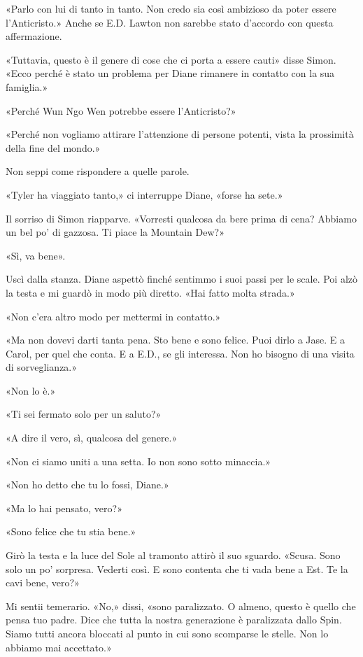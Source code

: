 «Parlo con lui di tanto in tanto. Non credo sia così ambizioso da poter
essere l'Anticristo.» Anche se E.D. Lawton non sarebbe stato d'accordo
con questa affermazione.

«Tuttavia, questo è il genere di cose che ci porta a essere cauti» disse
Simon. «Ecco perché è stato un problema per Diane rimanere in contatto
con la sua famiglia.»

«Perché Wun Ngo Wen potrebbe essere l'Anticristo?»

«Perché non vogliamo attirare l'attenzione di persone potenti, vista la
prossimità della fine del mondo.»

Non seppi come rispondere a quelle parole.

«Tyler ha viaggiato tanto,» ci interruppe Diane, «forse ha sete.»

Il sorriso di Simon riapparve. «Vorresti qualcosa da bere prima di cena?
Abbiamo un bel po' di gazzosa. Ti piace la Mountain Dew?»

«Sì, va bene».

Uscì dalla stanza. Diane aspettò finché sentimmo i suoi passi per le
scale. Poi alzò la testa e mi guardò in modo più diretto. «Hai fatto
molta strada.»

«Non c'era altro modo per mettermi in contatto.»

«Ma non dovevi darti tanta pena. Sto bene e sono felice. Puoi dirlo a
Jase. E a Carol, per quel che conta. E a E.D., se gli interessa. Non ho
bisogno di una visita di sorveglianza.»

«Non lo è.»

«Ti sei fermato solo per un saluto?»

«A dire il vero, sì, qualcosa del genere.»

«Non ci siamo uniti a una setta. Io non sono sotto minaccia.»

«Non ho detto che tu lo fossi, Diane.»

«Ma lo hai pensato, vero?»

«Sono felice che tu stia bene.»

Girò la testa e la luce del Sole al tramonto attirò il suo sguardo.
«Scusa. Sono solo un po' sorpresa. Vederti così. E sono contenta che ti
vada bene a Est. Te la cavi bene, vero?»

Mi sentii temerario. «No,» dissi, «sono paralizzato. O almeno, questo è
quello che pensa tuo padre. Dice che tutta la nostra generazione è
paralizzata dallo Spin. Siamo tutti ancora bloccati al punto in cui sono
scomparse le stelle. Non lo abbiamo mai accettato.»

